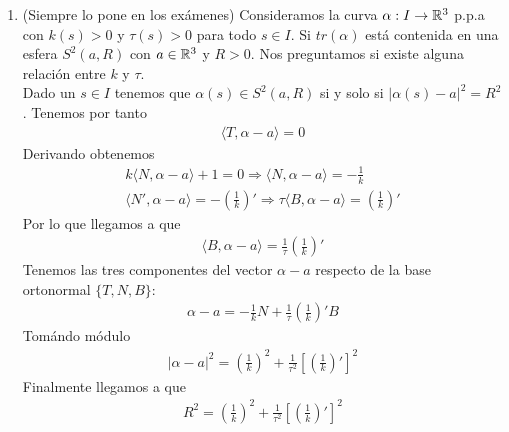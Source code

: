 \begin{ejercicio}
\begin{enumerate}
\begin{align*}
            &= k_0 \langle N_\alpha - N_h , T_\alpha - T_h\rangle - k_0\langle T_\alpha - T_h, N_\alpha-N_h\rangle - \tau_0 \langle B_\alpha - B_h, N_\alpha-N_h \rangle + \tau_0\langle N_\alpha - N_h, B_\alpha - B_h \rangle =\\
            &= 0
        \end{align*}
        Obtenemos por tanto que $f(s_0)=0$ y $f'(s)=0$ para todo $s\in I$ lo que nos dice que $f(s)=0$ para todo $s\in I$. Por la construcción de $f$ tenemos que 
        \begin{gather*}
            \alpha' = T_\alpha = T_h = h' \Rightarrow (\alpha - h)'(s) = 0\ \ \ \ \forall s \in I
        \end{gather*}
        Con la condición de $\alpha(s_0)=h(s_0)$ tenemos que $\alpha(s)=h(s)$ para todo $s\in I$.

        \item (Siempre lo pone en los exámenes) Consideramos la curva $\alpha:I\to \mathbb{R}^3$ p.p.a con $k(s)>0$ y $\tau(s)>0$ para todo $s\in I$. Si $tr(\alpha)$ está contenida en una esfera $S^2(a,R)$ con $a\in \mathbb{R}^3$ y $R>0$. Nos preguntamos si existe alguna relación entre $k$ y $\tau$.\\
        
        Dado un $s\in I$ tenemos que $\alpha(s)\in S^2(a,R)$ si y solo si $|\alpha(s) - a|^2 = R^2$. Tenemos por tanto
        \begin{gather*}
            \langle T, \alpha - a \rangle = 0
        \end{gather*}
        Derivando obtenemos 
        \begin{gather*}
            k\langle N , \alpha - a\rangle + 1 = 0 \Rightarrow \langle N, \alpha - a \rangle = - \frac{1}{k}\\
            \langle N', \alpha - a \rangle = - \left(\frac{1}{k}\right)' \Rightarrow \tau \langle B, \alpha -a \rangle = \left(\frac{1}{k}\right)'
        \end{gather*}
        Por lo que llegamos a que
        \begin{gather*}
            \langle B, \alpha -a \rangle = \frac{1}{\tau} \left(\frac{1}{k}\right)'
        \end{gather*}
        Tenemos las tres componentes del vector $\alpha -a$ respecto de la base ortonormal $\{T,N,B\}$:
        \begin{gather*}
            \alpha - a = - \frac{1}{k} N + \frac{1}{\tau} \left(\frac{1}{k}\right)'B
        \end{gather*}
        Tomándo módulo 
        \begin{gather*}
            |\alpha - a|^2 = \left(\frac{1}{k}\right)^2 + \frac{1}{\tau^2} \left[\left(\frac{1}{k}\right)'\right]^2
        \end{gather*} 
        Finalmente llegamos a que 
        \begin{gather*}
            R^2 = \left(\frac{1}{k}\right)^2 + \frac{1}{\tau^2} \left[\left(\frac{1}{k}\right)'\right]^2
        \end{gather*}


\end{enumerate}
\end{ejercicio}
